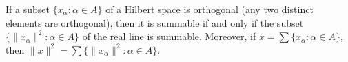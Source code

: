 If a subset $\{x_\alpha : \alpha \in A\}$ of a Hilbert space is orthogonal (any two distinct elements are orthogonal), then it is summable if and only if the subset $\{\|x_\alpha\|^2 : \alpha \in A\}$ of the real line is summable. Moreover, if $x = \sum \{x_\alpha : \alpha \in A\}$, then $\|x\|^2 = \sum \{\|x_\alpha\|^2 : \alpha \in A\}$.
